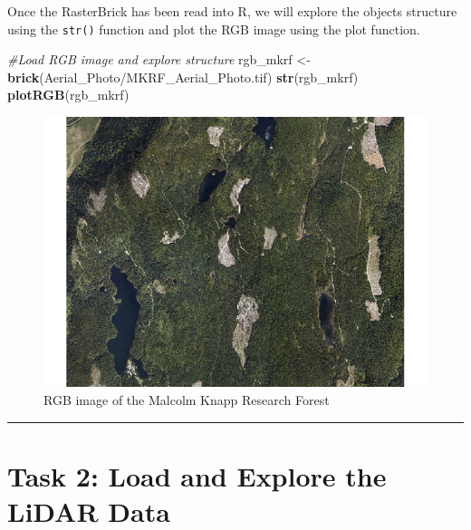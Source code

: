 \documentclass[
]{book}
\newenvironment{Shaded}{\begin{snugshade}}{\end{snugshade}}
\newcommand{\CommentTok}[1]{\textcolor[rgb]{0.56,0.35,0.01}{\textit{#1}}}
\newcommand{\FunctionTok}[1]{\textcolor[rgb]{0.13,0.29,0.53}{\textbf{#1}}}
\newcommand{\NormalTok}[1]{#1}
\newcommand{\OtherTok}[1]{\textcolor[rgb]{0.56,0.35,0.01}{#1}}
\newcommand{\StringTok}[1]{\textcolor[rgb]{0.31,0.60,0.02}{#1}}
\begin{document}
Once the RasterBrick has been read into R, we will explore the objects structure using the \texttt{str()} function and plot the RGB image using the plot function.

\begin{Shaded}
\begin{Highlighting}[]
\CommentTok{\#Load RGB image and explore structure}
\NormalTok{rgb\_mkrf }\OtherTok{\textless{}{-}} \FunctionTok{brick}\NormalTok{(}\StringTok{\textquotesingle{}Aerial\_Photo/MKRF\_Aerial\_Photo.tif\textquotesingle{}}\NormalTok{)}
\FunctionTok{str}\NormalTok{(rgb\_mkrf) }
\FunctionTok{plotRGB}\NormalTok{(rgb\_mkrf)}
\end{Highlighting}
\end{Shaded}

\begin{figure}

{\centering \includegraphics[width=1\linewidth]{images/03-rgb-malcolm-knapp} 

}

\caption{RGB image of the Malcolm Knapp Research Forest}\label{fig:03-rgb-malcolm-knapp}
\end{figure}

\begin{center}\rule{0.5\linewidth}{0.5pt}\end{center}

\hypertarget{task-2-load-and-explore-the-lidar-data}{%
\section*{Task 2: Load and Explore the LiDAR Data}\label{task-2-load-and-explore-the-lidar-data}}
\end{document}
